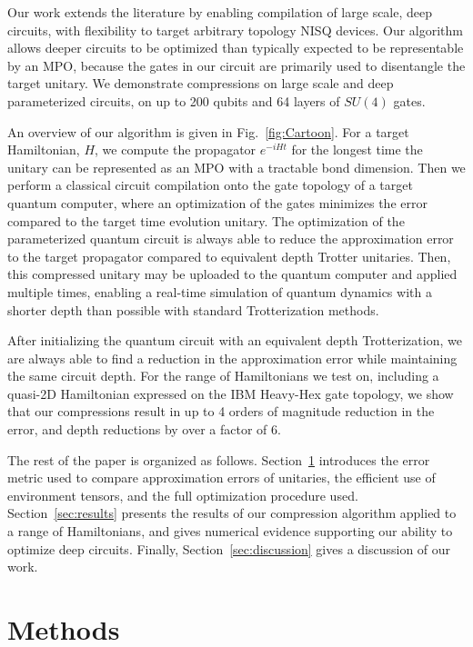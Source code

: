 \documentclass[a4paper,twocolumn,11pt,accepted=2025-06-10]{quantumarticle}
\begin{document}
Our work extends the literature by enabling compilation of large scale, deep circuits, with flexibility to target arbitrary topology NISQ devices. Our algorithm allows deeper circuits to be optimized than typically expected to be representable by an MPO, because the gates in our circuit are primarily used to disentangle the target unitary. We demonstrate compressions on large scale and deep parameterized circuits, on up to 200 qubits and 64 layers of $SU(4)$ gates.

An overview of our algorithm is given in Fig.~\ref{fig:Cartoon}. For a target Hamiltonian, $H$, we compute the propagator $e^{-iHt}$ for the longest time the unitary can be represented as an MPO with a tractable bond dimension. Then we perform a classical circuit compilation onto the gate topology of a target quantum computer, where an optimization of the gates minimizes the error compared to the target time evolution unitary. The optimization of the parameterized quantum circuit is always able to reduce the approximation error to the target propagator compared to equivalent depth Trotter unitaries. Then, this compressed unitary may be uploaded to the quantum computer and applied multiple times, enabling a real-time simulation of quantum dynamics with a shorter depth than possible with standard Trotterization methods. 

After initializing the quantum circuit with an equivalent depth Trotterization, we are always able to find a reduction in the approximation error while maintaining the same circuit depth.  For the range of Hamiltonians we test on, including a quasi-2D Hamiltonian expressed on the IBM Heavy-Hex gate topology, we show that our compressions result in up to 4 orders of magnitude reduction in the error, and depth reductions by over a factor of 6. 


The rest of the paper is organized as follows. Section~\ref{sec:methods} introduces the error metric used to compare approximation errors of unitaries, the efficient use of environment tensors, and the full optimization procedure used. Section~\ref{sec:results} presents the results of our compression algorithm applied to a range of Hamiltonians, and gives numerical evidence supporting our ability to optimize deep circuits. Finally, Section~\ref{sec:discussion} gives a discussion of our work.




\section{Methods}\label{sec:methods}
\end{document}
